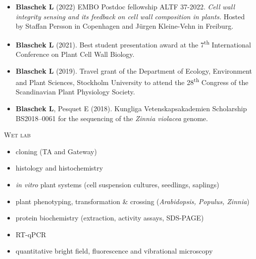 \documentclass[11pt]{article}
\begin{document}
\vspace{-0.175cm}
\begin{itemize}[label={},itemindent=-9pt,leftmargin=24pt]
	\itemsep-0.1cm
	\item \textbf{Blaschek L} (2022) EMBO Postdoc fellowship ALTF 37-2022. \textit{Cell wall integrity sensing and its feedback on cell wall composition in plants.} Hosted by Staffan Persson in Copenhagen and Jürgen Kleine-Vehn in Freiburg.
	\item \textbf{Blaschek L} (2021). Best student presentation award at the 7\textsuperscript{th} International Conference on Plant Cell Wall Biology.
	\item \textbf{Blaschek L} (2019). Travel grant of the Department of Ecology, Environment and Plant Sciences, Stockholm University to attend the 28\textsuperscript{th} Congress of the Scandinavian Plant Physiology Society.
	\item \textbf{Blaschek L}, Pesquet E (2018). Kungliga Vetenskapsakademien Scholarship BS2018--0061 for the sequencing of the \textit{Zinnia violacea} genome. 
\end{itemize}
\vspace{0.3cm}


\vspace{0.3cm}

\textsc{\large{Wet lab}} 
\vspace{-0.175cm}
\begin{addmargin}[24pt]{0pt}
	\begin{multicols}{2}
		\raggedright
		\begin{itemize}[itemindent=-9pt,leftmargin=24pt]
			\itemsep-0.1cm
			\item cloning (TA and Gateway)
			\item histology and histochemistry
			\item \textit{in vitro} plant systems (cell suspension cultures, seedlings, saplings)
			\item plant phenotyping, transformation  \& crossing (\textit{Arabidopsis, Populus, Zinnia})
			\item protein biochemistry (extraction, activity assays, SDS-PAGE)
			\item RT-qPCR
			\item quantitative bright field, fluorescence and vibrational microscopy
		\end{itemize}
	\end{multicols}
\end{addmargin}
\vspace{0.2cm}
\end{document}
